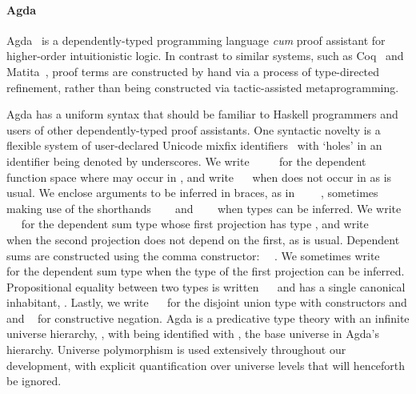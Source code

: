 
\paragraph{Agda}

Agda~\cite{norell_dependently_2009} is a dependently-typed programming language \emph{cum} proof assistant for higher-order intuitionistic logic.
In contrast to similar systems, such as Coq~\cite{bertot_short_2008} and Matita~\cite{asperti_matita_2011}, proof terms are constructed by hand via a process of type-directed refinement, rather than being constructed via tactic-assisted metaprogramming.

Agda has a uniform syntax that should be familiar to Haskell programmers and users of other dependently-typed proof assistants.
One syntactic novelty is a flexible system of user-declared Unicode mixfix identifiers~\cite{danielsson_parsing_2011} with `holes' in an identifier being denoted by underscores.
We write \AgdaSymbol{(}~\AgdaSymbol{:}~\AgdaSymbol{)}~~ for the dependent function space where  may occur in , and write ~~ when  does not occur in  as is usual.
We enclose arguments to be inferred in braces, as in \AgdaSymbol{\{}~\AgdaSymbol{:}~\AgdaSymbol{\}}~~, sometimes making use of the shorthands ~~~ and ~\AgdaSymbol{\{}\AgdaSymbol{\}}~~ when types can be inferred.
We write ~~ for the dependent sum type whose first projection has type , and write ~~ when the second projection does not depend on the first, as is usual.
Dependent sums are constructed using the comma constructor: ~\AgdaInductiveConstructor{,}~.
We sometimes write ~~~~ for the dependent sum type when the type of the first projection can be inferred.
Propositional equality between two types is written ~~ and has a single canonical inhabitant, .
Lastly, we write ~~ for the disjoint union type with constructors  and  and ~ for constructive negation.
Agda is a predicative type theory with an infinite universe hierarchy, , with  being identified with , the base universe in Agda's hierarchy.
Universe polymorphism is used extensively throughout our development, with explicit quantification over universe levels that will henceforth be ignored.

